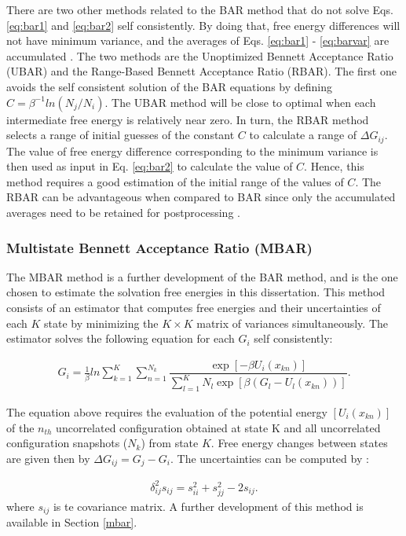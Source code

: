There are two other methods related to the BAR method that do not solve Eqs. \eqref{eq:bar1} and \eqref{eq:bar2} self consistently. By doing that, free energy differences will not have minimum variance, and the averages of Eqs. \eqref{eq:bar1} - \eqref{eq:barvar} are accumulated \cite{bareva}. The two methods are the Unoptimized Bennett Acceptance Ratio (UBAR) and the Range-Based Bennett Acceptance Ratio (RBAR). The first one avoids the self consistent solution of the BAR equations by defining $C=\beta^{-1}ln(N_{j}/N_{i})$. The UBAR method will be close to optimal when each intermediate free energy is relatively near zero. In turn, the RBAR method selects a range of initial guesses of the constant $C$ to calculate a range of $\Delta G_{ij}$. The value of free energy difference corresponding to the minimum variance is then used as input in Eq. \eqref{eq:bar2} to calculate the value of $C$. Hence, this method requires a good estimation of the initial range of the values of $C$. The RBAR can be advantageous when compared to BAR since only the accumulated averages need to be retained for postprocessing \cite{bareva}.  

\subsubsection{Multistate Bennett Acceptance Ratio (MBAR)}

The MBAR method \cite{mbar} is a further development of the BAR method, and is the one chosen to estimate the solvation free energies in this dissertation. This method consists of an estimator that computes free energies and their uncertainties of each $K$ state by minimizing the $K \times K$ matrix of variances simultaneously. The estimator solves the following equation for each $G_{i}$ self consistently:


\begin{equation}
\label{eq:mbar}
\begin{aligned}
G_{i} = \frac{1}{\beta}ln \sum_{k=1}^{K} \sum_{n=1}^{N_{k}}
\dfrac{\exp[-\beta U_{i}(x_{kn})]}{\sum_{l=1}^{K} N_{l} \exp[\beta (G_{l} - U_{l}(x_{kn}))]} .
\end{aligned}
\end{equation}

The equation above requires the evaluation of the potential energy $[U_{i}(x_{kn})]$ of  the $n_{th}$ uncorrelated configuration obtained at state K and  all uncorrelated configuration snapshots ($N_{k}$) from state $K$. Free energy changes between states are given then by $\Delta G_{ij} = G_{j} -  G_{i}$. The uncertainties  can be computed by :

\begin{equation}
\begin{aligned}
\delta _{ij}^{2} s_{ij} = s_{ii}^{2} + s_{jj}^{2} - 2 s_{ij}.
\end{aligned}
\end{equation}
where $s_{ij}$ is te covariance matrix. A further development of this method is available in Section \ref{mbar}.

